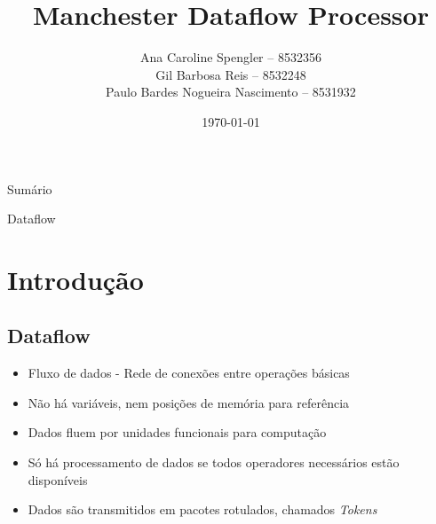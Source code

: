 \documentclass{beamer}
\title{Manchester Dataflow Processor}
\author[Ana, Gil, Paulo]
		{Ana Caroline Spengler -- 8532356 \\
        Gil Barbosa Reis -- 8532248 \\
        Paulo Bardes Nogueira Nascimento -- 8531932}
\institute[ICMC]{ICMC - USP São Carlos}
\date{\today}
\begin{document}
\begin{frame}
	\titlepage
\end{frame}

\begin{frame}{Sumário}
	\tableofcontents
\end{frame}

\begin{frame}{Dataflow}
	\section{Introdução}
	\subsection{Dataflow}
	
	\begin{itemize}
		\item Fluxo de dados - Rede de conexões entre operações básicas
		\item Não há variáveis, nem posições de memória para referência
		\item Dados fluem por unidades funcionais para computação
		\item Só há processamento de dados se todos operadores necessários estão disponíveis
		\item Dados são transmitidos em pacotes rotulados, chamados {\em Tokens}
	\end{itemize}
\end{frame}
\end{document}
